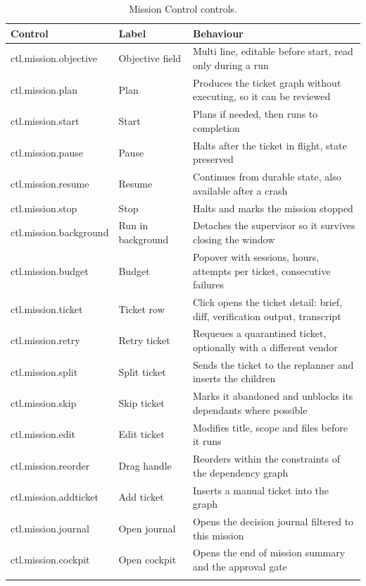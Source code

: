 \begin{longtable}{@{}p{} p{} p{}@{}}
\toprule
\textbf{Control} & \textbf{Label} & \textbf{Behaviour} \\
\midrule
\endhead
ctl.mission.objective & Objective field & Multi line, editable before start, read only during a run \\
ctl.mission.plan & Plan & Produces the ticket graph without executing, so it can be reviewed \\
ctl.mission.start & Start & Plans if needed, then runs to completion \\
ctl.mission.pause & Pause & Halts after the ticket in flight, state preserved \\
ctl.mission.resume & Resume & Continues from durable state, also available after a crash \\
ctl.mission.stop & Stop & Halts and marks the mission stopped \\
ctl.mission.background & Run in background & Detaches the supervisor so it survives closing the window \\
ctl.mission.budget & Budget & Popover with sessions, hours, attempts per ticket, consecutive failures \\
ctl.mission.ticket & Ticket row & Click opens the ticket detail: brief, diff, verification output, transcript \\
ctl.mission.retry & Retry ticket & Requeues a quarantined ticket, optionally with a different vendor \\
ctl.mission.split & Split ticket & Sends the ticket to the replanner and inserts the children \\
ctl.mission.skip & Skip ticket & Marks it abandoned and unblocks its dependants where possible \\
ctl.mission.edit & Edit ticket & Modifies title, scope and files before it runs \\
ctl.mission.reorder & Drag handle & Reorders within the constraints of the dependency graph \\
ctl.mission.addticket & Add ticket & Inserts a manual ticket into the graph \\
ctl.mission.journal & Open journal & Opens the decision journal filtered to this mission \\
ctl.mission.cockpit & Open cockpit & Opens the end of mission summary and the approval gate \\
\bottomrule
\caption{Mission Control controls.}
\end{longtable}

